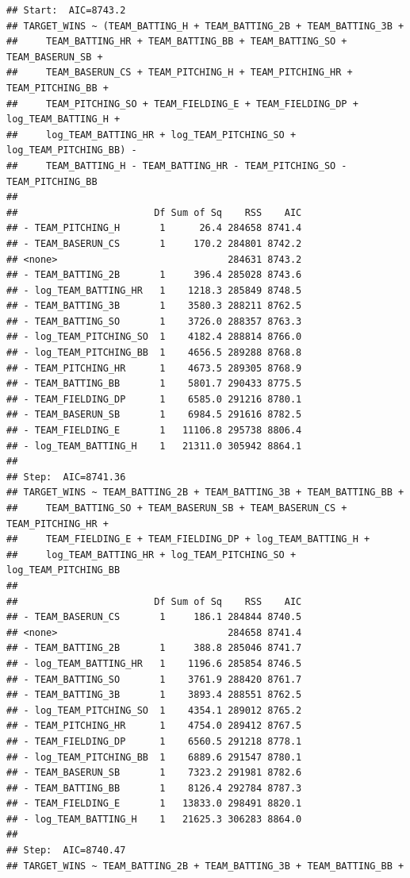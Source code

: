 \documentclass[
]{article}
\begin{document}
\begin{verbatim}
## Start:  AIC=8743.2
## TARGET_WINS ~ (TEAM_BATTING_H + TEAM_BATTING_2B + TEAM_BATTING_3B + 
##     TEAM_BATTING_HR + TEAM_BATTING_BB + TEAM_BATTING_SO + TEAM_BASERUN_SB + 
##     TEAM_BASERUN_CS + TEAM_PITCHING_H + TEAM_PITCHING_HR + TEAM_PITCHING_BB + 
##     TEAM_PITCHING_SO + TEAM_FIELDING_E + TEAM_FIELDING_DP + log_TEAM_BATTING_H + 
##     log_TEAM_BATTING_HR + log_TEAM_PITCHING_SO + log_TEAM_PITCHING_BB) - 
##     TEAM_BATTING_H - TEAM_BATTING_HR - TEAM_PITCHING_SO - TEAM_PITCHING_BB
## 
##                        Df Sum of Sq    RSS    AIC
## - TEAM_PITCHING_H       1      26.4 284658 8741.4
## - TEAM_BASERUN_CS       1     170.2 284801 8742.2
## <none>                              284631 8743.2
## - TEAM_BATTING_2B       1     396.4 285028 8743.6
## - log_TEAM_BATTING_HR   1    1218.3 285849 8748.5
## - TEAM_BATTING_3B       1    3580.3 288211 8762.5
## - TEAM_BATTING_SO       1    3726.0 288357 8763.3
## - log_TEAM_PITCHING_SO  1    4182.4 288814 8766.0
## - log_TEAM_PITCHING_BB  1    4656.5 289288 8768.8
## - TEAM_PITCHING_HR      1    4673.5 289305 8768.9
## - TEAM_BATTING_BB       1    5801.7 290433 8775.5
## - TEAM_FIELDING_DP      1    6585.0 291216 8780.1
## - TEAM_BASERUN_SB       1    6984.5 291616 8782.5
## - TEAM_FIELDING_E       1   11106.8 295738 8806.4
## - log_TEAM_BATTING_H    1   21311.0 305942 8864.1
## 
## Step:  AIC=8741.36
## TARGET_WINS ~ TEAM_BATTING_2B + TEAM_BATTING_3B + TEAM_BATTING_BB + 
##     TEAM_BATTING_SO + TEAM_BASERUN_SB + TEAM_BASERUN_CS + TEAM_PITCHING_HR + 
##     TEAM_FIELDING_E + TEAM_FIELDING_DP + log_TEAM_BATTING_H + 
##     log_TEAM_BATTING_HR + log_TEAM_PITCHING_SO + log_TEAM_PITCHING_BB
## 
##                        Df Sum of Sq    RSS    AIC
## - TEAM_BASERUN_CS       1     186.1 284844 8740.5
## <none>                              284658 8741.4
## - TEAM_BATTING_2B       1     388.8 285046 8741.7
## - log_TEAM_BATTING_HR   1    1196.6 285854 8746.5
## - TEAM_BATTING_SO       1    3761.9 288420 8761.7
## - TEAM_BATTING_3B       1    3893.4 288551 8762.5
## - log_TEAM_PITCHING_SO  1    4354.1 289012 8765.2
## - TEAM_PITCHING_HR      1    4754.0 289412 8767.5
## - TEAM_FIELDING_DP      1    6560.5 291218 8778.1
## - log_TEAM_PITCHING_BB  1    6889.6 291547 8780.1
## - TEAM_BASERUN_SB       1    7323.2 291981 8782.6
## - TEAM_BATTING_BB       1    8126.4 292784 8787.3
## - TEAM_FIELDING_E       1   13833.0 298491 8820.1
## - log_TEAM_BATTING_H    1   21625.3 306283 8864.0
## 
## Step:  AIC=8740.47
## TARGET_WINS ~ TEAM_BATTING_2B + TEAM_BATTING_3B + TEAM_BATTING_BB + 

\end{verbatim}
\end{document}
